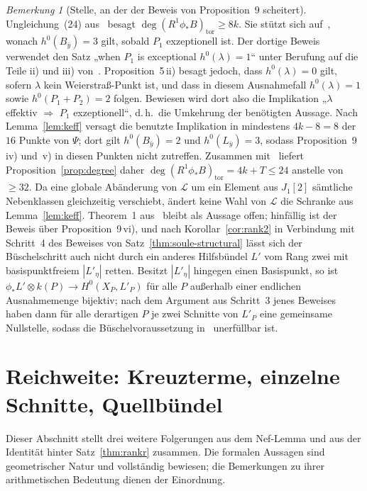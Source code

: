 \documentclass[11pt]{article}
\theoremstyle{definition}
\theoremstyle{remark}
\newtheorem{remark}[theorem]{Bemerkung}
\newcommand{\cL}{\mathcal{L}}
\begin{document}
\begin{remark}[Stelle, an der der Beweis von Proposition~9 scheitert]\label{rem:gap}
Ungleichung~(24) aus~\cite{So26} besagt
$\deg(R^1\phi_*B)_{\mathrm{tor}}\ge 8k$. Sie stützt sich
auf~\cite[Prop.~9\,iv)]{So26}, wonach $h^0(B_{\bar y})=3$ gilt, sobald $P_1$
exzeptionell ist. Der dortige Beweis verwendet den Satz „when $P_1$ is
exceptional $h^0(\lambda)=1$“ unter Berufung auf die Teile ii) und iii)
von~\cite[Prop.~5]{So26}. Proposition~5\,ii) besagt jedoch, dass $h^0(\lambda)=0$
gilt, sofern $\lambda$ kein Weierstraß-Punkt ist, und dass in diesem Ausnahmefall
$h^0(\lambda)=1$ sowie $h^0(P_1+P_2)=2$ folgen. Bewiesen wird dort also die
Implikation „$\lambda$ effektiv $\Rightarrow$ $P_1$ exzeptionell“, d.\,h.\ die
Umkehrung der benötigten Aussage. Nach Lemma~\ref{lem:keff} versagt die benutzte
Implikation in mindestens $4k-8=8$ der $16$ Punkte von $\Psi$; dort gilt
$h^0(B_{\bar y})=2$ und $h^0(L_{\bar y})=3$, sodass Proposition~9\,iv) und~v) in
diesen Punkten nicht zutreffen. Zusammen mit~\cite[(16), (18), (22)]{So26}
liefert Proposition~\ref{prop:degree} daher
$\deg(R^1\phi_*B)_{\mathrm{tor}}=4k+T\le 24$ anstelle von $\ge 32$. Da eine
globale Abänderung von $\cL$ um ein Element aus $J_1[2]$ sämtliche Nebenklassen
gleichzeitig verschiebt, ändert keine Wahl von $\cL$ die Schranke aus
Lemma~\ref{lem:keff}. Theorem~1 aus~\cite{So26} bleibt als Aussage offen;
hinfällig ist der Beweis über Proposition~9\,vi), und nach
Korollar~\ref{cor:rank2} in Verbindung mit Schritt~4 des Beweises von
Satz~\ref{thm:soule-structural} lässt sich der Büschelschritt auch nicht durch
ein anderes Hilfsbündel $L'$ vom Rang zwei mit basispunktfreiem $|L'_\eta|$
retten. Besitzt $|L'_\eta|$ hingegen einen Basispunkt, so ist
$\phi_*L'\otimes k(P)\to H^0(X_P,L'_P)$ für alle $P$ außerhalb einer endlichen
Ausnahmemenge bijektiv; nach dem Argument aus Schritt~3 jenes Beweises haben dann
für alle derartigen $P$ je zwei Schnitte von $L'_P$ eine gemeinsame Nullstelle,
sodass die Büschelvoraussetzung in~\cite[(28)]{So26} unerfüllbar ist.
\end{remark}

\section{Reichweite: Kreuzterme, einzelne Schnitte, Quellbündel}\label{sec:scope}

Dieser Abschnitt stellt drei weitere Folgerungen aus dem Nef-Lemma und aus der
Identität hinter Satz~\ref{thm:rankr} zusammen. Die formalen Aussagen sind
geometrischer Natur und vollständig bewiesen; die Bemerkungen zu ihrer
arithmetischen Bedeutung dienen der Einordnung.
\end{document}
